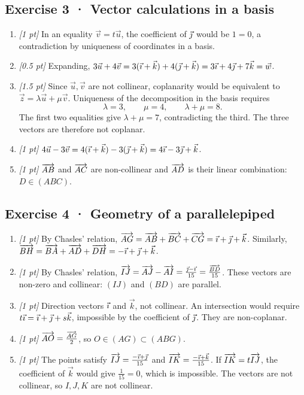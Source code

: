 \subsection*{Exercise 3 · Vector calculations in a basis}\begin{enumerate}

\item \textit{[1 pt]} In an equality $\vec v=t\vec u$, the coefficient of $\vec{\jmath} $ would be $1=0$, a contradiction by uniqueness of coordinates in a basis.

\item \textit{[0.5 pt]} Expanding, $3\vec u+4\vec v=3(\vec{\imath} +\vec k)+4(\vec{\jmath} +\vec k)=3\vec{\imath} +4\vec{\jmath} +7\vec k=\vec w$.

\item \textit{[1.5 pt]} Since $\vec u,\vec v$ are not collinear, coplanarity would be equivalent to $\vec z=\lambda\vec u+\mu\vec v$. Uniqueness of the decomposition in the basis requires
\[\lambda=3,\qquad\mu=4,\qquad\lambda+\mu=8.\]
The first two equalities give $\lambda+\mu=7$, contradicting the third. The three vectors are therefore not coplanar.

\item \textit{[1 pt]} $4\vec u-3\vec v=4(\vec{\imath} +\vec k)-3(\vec{\jmath} +\vec k)=4\vec{\imath} -3\vec{\jmath} +\vec k$.

\item \textit{[1 pt]} $\overrightarrow{AB}$ and $\overrightarrow{AC}$ are non-collinear and $\overrightarrow{AD}$ is their linear combination: $D\in(ABC)$.

\end{enumerate}

\subsection*{Exercise 4 · Geometry of a parallelepiped}\begin{enumerate}

\item \textit{[1 pt]} By Chasles' relation, $\overrightarrow{AG}=\overrightarrow{AB}+\overrightarrow{BC}+\overrightarrow{CG}=\vec{\imath} +\vec{\jmath} +\vec k$. Similarly, $\overrightarrow{BH}=\overrightarrow{BA}+\overrightarrow{AD}+\overrightarrow{DH}=-\vec{\imath} +\vec{\jmath} +\vec k$.

\item \textit{[1 pt]} By Chasles' relation, $\overrightarrow{IJ}=\overrightarrow{AJ}-\overrightarrow{AI}=\frac{\vec{\jmath} -\vec{\imath} }{15}=\frac{\overrightarrow{BD}}{15}$. These vectors are non-zero and collinear: $(IJ)$ and $(BD)$ are parallel.

\item \textit{[1 pt]} Direction vectors $\vec{\imath} $ and $\vec k$, not collinear. An intersection would require $t\vec{\imath} =\vec{\imath} +\vec{\jmath} +s\vec k$, impossible by the coefficient of $\vec{\jmath} $. They are non-coplanar.

\item \textit{[1 pt]} $\overrightarrow{AO}=\frac{\overrightarrow{AG}}{2}$, so $O\in(AG)\subset(ABG)$.

\item \textit{[1 pt]} The points satisfy $\overrightarrow{IJ}=\frac{-\vec{\imath} +\vec{\jmath} }{15}$ and $\overrightarrow{IK}=\frac{-\vec{\imath} +\vec k}{15}$. If $\overrightarrow{IK}=t\overrightarrow{IJ}$, the coefficient of $\vec k$ would give $\frac{1}{15}=0$, which is impossible. The vectors are not collinear, so $I,J,K$ are not collinear.

\end{enumerate}

